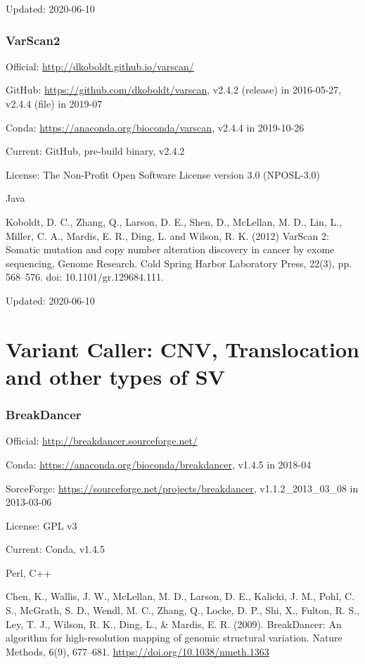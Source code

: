\documentclass[]{article}
\begin{document}
Updated: 2020-06-10

\section{VarScan2}

Official: \url{http://dkoboldt.github.io/varscan/}

GitHub: \url{https://github.com/dkoboldt/varscan}, v2.4.2 (release) in 2016-05-27, v2.4.4 (file) in 2019-07

Conda: \url{https://anaconda.org/bioconda/varscan}, v2.4.4 in 2019-10-26

Current: GitHub, pre-build binary, v2.4.2

License: The Non-Profit Open Software License version 3.0 (NPOSL-3.0)

Java

Koboldt, D. C., Zhang, Q., Larson, D. E., Shen, D., McLellan, M. D., Lin, L., Miller, C. A., Mardis, E. R., Ding, L. and Wilson, R. K. (2012) VarScan 2: Somatic mutation and copy number alteration discovery in cancer by exome sequencing, Genome Research. Cold Spring Harbor Laboratory Press, 22(3), pp. 568–576. doi: 10.1101/gr.129684.111.

Updated: 2020-06-10
\part{Variant Caller: CNV, Translocation and other types of SV}
\section{BreakDancer}

Official: \url{http://breakdancer.sourceforge.net/}

Conda: \url{https://anaconda.org/bioconda/breakdancer}, v1.4.5 in 2018-04

SorceForge: \url{https://sourceforge.net/projects/breakdancer}, v1.1.2\_2013\_03\_08 in 2013-03-06

License: GPL v3

Current: Conda, v1.4.5

Perl, C++

Chen, K., Wallis, J. W., McLellan, M. D., Larson, D. E., Kalicki, J. M., Pohl, C. S., McGrath, S. D., Wendl, M. C., Zhang, Q., Locke, D. P., Shi, X., Fulton, R. S., Ley, T. J., Wilson, R. K., Ding, L., \& Mardis, E. R. (2009). BreakDancer: An algorithm for high-resolution mapping of genomic structural variation. Nature Methods, 6(9), 677–681. \url{https://doi.org/10.1038/nmeth.1363}
\end{document}
